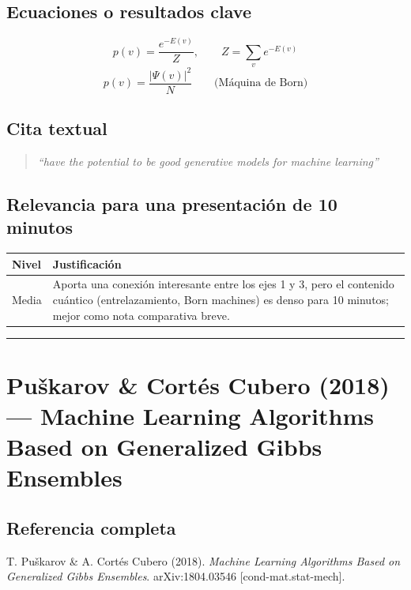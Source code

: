 \documentclass[12pt]{article}
\begin{document}
\subsection*{Ecuaciones o resultados clave}
\begin{equation}
p(v) = \frac{e^{-E(v)}}{Z}, \qquad Z = \sum_v e^{-E(v)}
\end{equation}
\begin{equation}
p(v) = \frac{|\Psi(v)|^2}{N} \qquad \text{(Máquina de Born)}
\end{equation}

\subsection*{Cita textual}
\begin{quote}
\textit{``have the potential to be good generative models for machine learning''}
\end{quote}

\subsection*{Relevancia para una presentación de 10 minutos}
\begin{tabular}{@{}p{2cm}p{11.5cm}@{}}
\toprule
\textbf{Nivel} & \textbf{Justificación} \\
\midrule
Media & Aporta una conexión interesante entre los ejes 1 y 3, pero el contenido cuántico (entrelazamiento, Born machines) es denso para 10 minutos; mejor como nota comparativa breve. \\
\bottomrule
\end{tabular}

\bigskip
\hrule
\bigskip

\section{Pu\v{s}karov \& Cort\'es Cubero (2018) --- Machine Learning Algorithms Based on Generalized Gibbs Ensembles}

\subsection*{Referencia completa}
T. Pu\v{s}karov \& A. Cort\'es Cubero (2018). \textit{Machine Learning Algorithms Based on
Generalized Gibbs Ensembles}. arXiv:1804.03546 [cond-mat.stat-mech]. \cite{puskarov2018}
\end{document}

